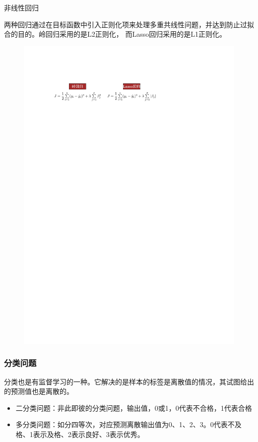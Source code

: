 \textcolor{main1}{非线性回归}
\begin{definition}[非线性回归]
    两种回归通过在目标函数中引入\textcolor{main1}{正则化项}来处理\textcolor{main1}{多重共线性问题}，并达到防止过拟合的目的。岭回归采用的是L2正则化，
而Lasso回归采用的是L1正则化。    
\end{definition}
\begin{figure}[htbp]
    \centering
    \includegraphics{image/非线性回归.pdf}
\end{figure}

\subsubsection{分类问题}
\begin{definition}[分类问题]
    分类也是有监督学习的一种。它解决的是样本的标签是离散值的情况，其试图给出的预测值也是离散的。
    \begin{itemize}
        \item \textcolor{main1}{二分类问题：}非此即彼的分类问题，输出值，0或1，0代表不合格，1代表合格
        \item \textcolor{main1}{多分类问题：}如分四等次，对应预测离散输出值为0、1、2、3。0代表不及格、1表示及格、2表示良好、3表示优秀。
    \end{itemize}
\end{definition}

